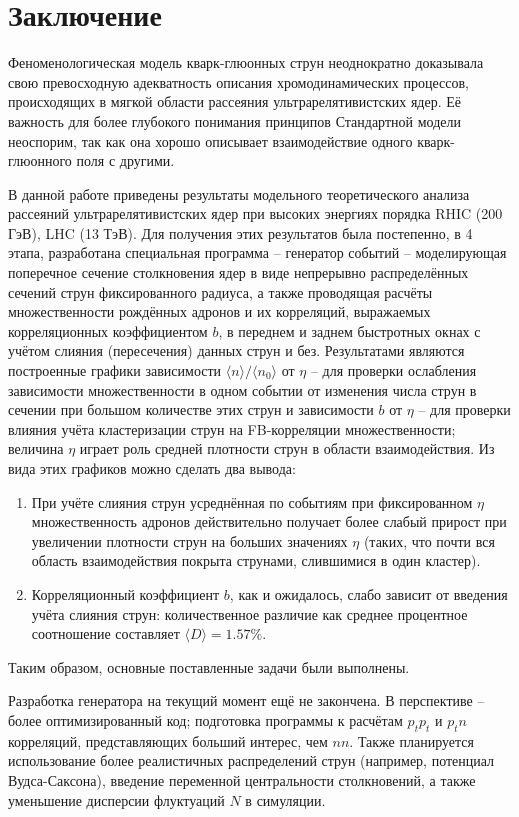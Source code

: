 \section{Заключение}
Феноменологическая модель кварк-глюонных струн неоднократно доказывала свою превосходную адекватность описания хромодинамических процессов, происходящих в мягкой области рассеяния ультрарелятивистских ядер. Её важность для более глубокого понимания принципов Стандартной модели неоспорим, так как она хорошо описывает взаимодействие одного кварк-глюонного поля с другими. 

В данной работе приведены результаты модельного теоретического анализа рассеяний ультрарелятивистских ядер при высоких энергиях порядка RHIC (200 ГэВ), LHC (13 ТэВ). Для получения этих результатов была постепенно, в 4 этапа, разработана специальная программа -- генератор событий -- моделирующая поперечное сечение столкновения ядер в виде непрерывно распределённых сечений струн фиксированного радиуса, а также проводящая расчёты множественности рождённых адронов и их корреляций, выражаемых корреляционных коэффициентом $b$, в переднем и заднем быстротных окнах с учётом слияния (пересечения) данных струн и без. Результатами являются построенные графики зависимости $\langle n \rangle / \langle n_0 \rangle$ от $\eta$ -- для проверки ослабления зависимости множественности в одном событии от изменения числа струн в сечении при большом количестве этих струн и зависимости $b$ от $\eta$ -- для проверки влияния учёта кластеризации струн на FB-корреляции множественности; величина $\eta$ играет роль средней плотности струн в области взаимодействия. Из вида этих графиков можно сделать два вывода: 
\begin{enumerate}[label=\arabic*.]
\item	При учёте слияния струн усреднённая по событиям при фиксированном $\eta$ множественность адронов действительно получает более слабый прирост при увеличении плотности струн на больших значениях $\eta$ (таких, что почти вся область взаимодействия покрыта струнами, слившимися в один кластер).
\item	Корреляционный коэффициент $b$, как и ожидалось, слабо зависит от введения учёта слияния струн: количественное различие как среднее процентное соотношение составляет $\langle D \rangle = 1.57 \%$. 
\end{enumerate}
Таким образом, основные поставленные задачи были выполнены.

Разработка генератора на текущий момент ещё не закончена. В перспективе -- более оптимизированный код; подготовка программы к расчётам $p_t p_t$ и $p_t n$ корреляций, представляющих больший интерес, чем $nn$. Также планируется использование более реалистичных распределений струн (например, потенциал Вудса-Саксона), введение переменной центральности столкновений, а также уменьшение дисперсии флуктуаций $N$ в симуляции.